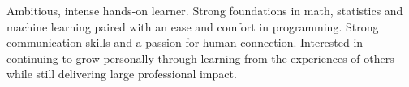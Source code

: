 

\begin{cvparagraph}

Ambitious, intense hands-on learner. Strong foundations
in math, statistics and machine learning paired with an ease and comfort in
programming. Strong communication skills and a passion
for human connection. Interested in continuing to grow personally through
learning from the experiences of others while still delivering large
professional impact.
\end{cvparagraph}
